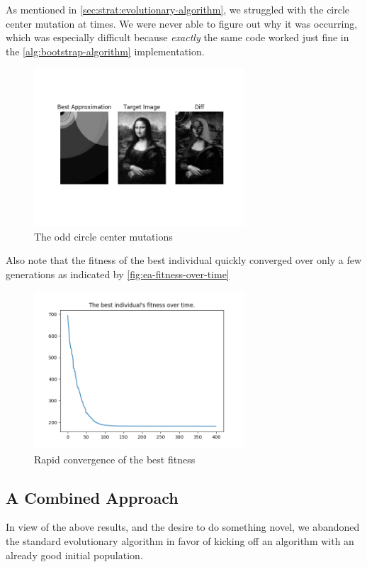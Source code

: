 \documentclass{article}
\begin{document}
As mentioned in \autoref{sec:strat:evolutionary-algorithm}, we struggled with the circle center
mutation at times. We were never able to figure out why it was occurring, which was especially
difficult because \textit{exactly} the same code worked just fine in the
\autoref{alg:bootstrap-algorithm} implementation.

\begin{figure}[H]
    \centering
    \includegraphics[width=0.7\textwidth]{output/ea-p100c200g400.png}
    \caption{The odd circle center mutations}\label{fig:center-mutations}
\end{figure}

Also note that the fitness of the best individual quickly converged over only a few generations as
indicated by \autoref{fig:ea-fitness-over-time}

\begin{figure}[H]
    \centering
    \includegraphics[width=0.7\textwidth]{output/ea-cooler-p100c200g400-fitness.png}
    \caption{Rapid convergence of the best fitness}\label{fig:ea-fitness-over-time}
\end{figure}

\subsection{A Combined Approach}\label{sec:results:combined-approach}
In view of the above results, and the desire to do something novel, we abandoned the standard
evolutionary algorithm in favor of kicking off an algorithm with an already good initial
population.
\end{document}
